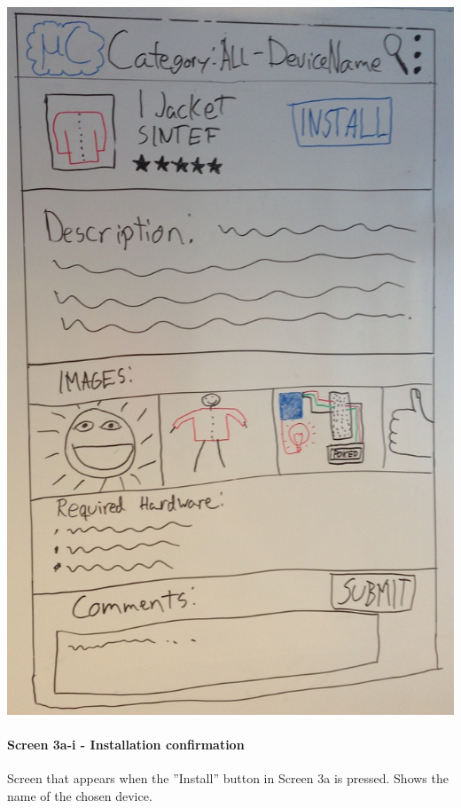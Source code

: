 \begin{image}[H]
\includegraphics[scale=0.2]{images/Design_guide/Screen3a.png}
\end{image}


\paragraph{Screen 3a-i - Installation confirmation}
Screen that appears when the ''Install'' button in Screen 3a is pressed. Shows the name of the chosen device.

